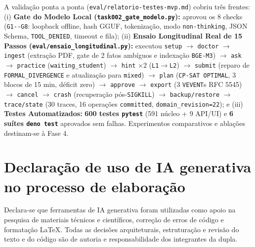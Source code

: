 \documentclass[12pt,a4paper]{article}
\newcommand{\code}[1]{\nolinkurl{#1}}
\begin{document}
A validação ponta a ponta (\code{eval/relatorio-testes-mvp.md}) cobriu três frentes: (i) \textbf{Gate do Modelo Local (\code{task002\_gate\_modelo.py}):} aprovou os 8 checks (\code{G1--G8}: loopback offline, hash GGUF, tokenização, modo \code{non-thinking}, JSON Schema, \code{TOOL\_DENIED}, timeout e fila); (ii) \textbf{Ensaio Longitudinal Real de 15 Passos (\code{eval/ensaio\_longitudinal.py}):} executou \code{setup} $\rightarrow$ \code{doctor} $\rightarrow$ \code{ingest} (extração PDF, gate de 2 fatos ambíguos e indexação \code{BGE-M3}) $\rightarrow$ \code{ask} $\rightarrow$ \code{practice} (\code{waiting\_student}) $\rightarrow$ \code{hint} $\times 2$ (\code{L1}$\rightarrow$\code{L2}) $\rightarrow$ \code{submit} (reparo de \code{FORMAL\_DIVERGENCE} e atualização para \code{mixed}) $\rightarrow$ \code{plan} (\code{CP-SAT OPTIMAL}, 3 blocos de 15 min, déficit zero) $\rightarrow$ \code{approve} $\rightarrow$ \code{export} (3 \code{VEVENT}s RFC 5545) $\rightarrow$ \code{cancel} $\rightarrow$ \code{crash} (recuperação pós-\code{SIGKILL}) $\rightarrow$ \code{backup/restore} $\rightarrow$ \code{trace/state} (30 traces, 16 operações \code{committed}, \code{domain\_revision=22}); e (iii) \textbf{Testes Automatizados:} \textbf{600 testes \code{pytest}} (591 núcleo + 9 API/UI) e \textbf{6 suítes \code{deno test}} aprovados sem falhas. Experimentos comparativos e ablações destinam-se à Fase 4.

\section*{Declaração de uso de IA generativa no processo de elaboração}


Declara-se que ferramentas de IA generativa foram utilizadas como apoio na pesquisa de materiais técnicos e científicos, correção de erros de código e formatação LaTeX. Todas as decisões arquiteturais, estruturação e revisão do texto e do código são de autoria e responsabilidade dos integrantes da dupla.

{\footnotesize


}
\end{document}
